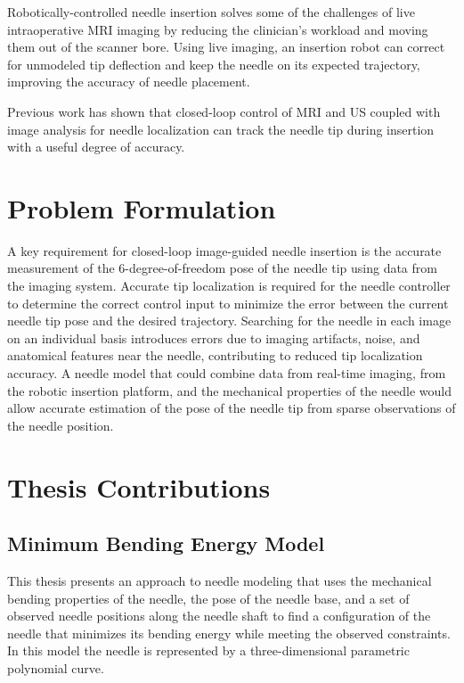 Robotically-controlled needle insertion solves some of the challenges of live intraoperative MRI imaging by reducing the clinician's workload and moving them out of the scanner bore. Using live imaging, an insertion robot can correct for unmodeled tip deflection and keep the needle on its expected trajectory, improving the accuracy of needle placement.

Previous work has shown that closed-loop control of MRI\cite{patel_closed-loop_2015} and US\cite{vrooijink_needle_2014} coupled with image analysis for needle localization can track the needle tip during insertion with a useful degree of accuracy.

\section{Problem Formulation}
\label{sec:problem_formulation}
A key requirement for closed-loop image-guided needle insertion is the accurate measurement of the 6-degree-of-freedom pose of the needle tip using data from the imaging system. Accurate tip localization is required for the needle controller to determine the correct control input to minimize the error between the current needle tip pose and the desired trajectory. Searching for the needle in each image on an individual basis introduces errors due to imaging artifacts, noise, and anatomical features near the needle, contributing to reduced tip localization accuracy. A needle model that could combine data from real-time imaging, from the robotic insertion platform, and the mechanical properties of the needle would allow accurate estimation of the pose of the needle tip from sparse observations of the needle position.


\section{Thesis Contributions}

\subsection{Minimum Bending Energy Model}
This thesis presents an approach to needle modeling that uses the mechanical bending properties of the needle, the pose of the needle base, and a set of observed needle positions along the needle shaft to find a configuration of the needle that minimizes its bending energy while meeting the observed constraints. In this model the needle is represented by a three-dimensional parametric polynomial curve. 

